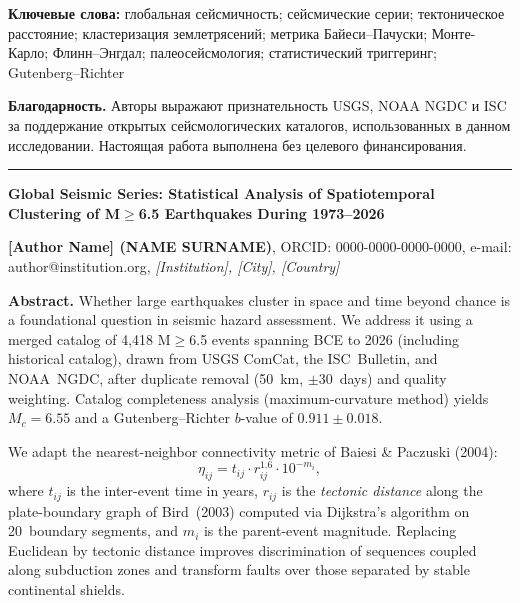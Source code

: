 \documentclass[12pt,a4paper]{article}
\begin{document}
\vspace{0.4cm}

\noindent\textbf{Ключевые слова:}
глобальная сейсмичность;
сейсмические серии;
тектоническое расстояние;
кластеризация землетрясений;
метрика Байеси--Пачуски;
Монте-Карло;
Флинн--Энгдал;
палеосейсмология;
статистический триггеринг;
Gutenberg--Richter

\vspace{0.4cm}

\noindent\textbf{Благодарность.}
Авторы выражают признательность USGS, NOAA NGDC и ISC за поддержание открытых
сейсмологических каталогов, использованных в данном исследовании.
Настоящая работа выполнена без целевого финансирования.

\vspace{0.8cm}
\hrule
\vspace{0.5cm}


\begin{center}
{\large\bfseries
Global Seismic Series: Statistical Analysis of Spatiotemporal\\
Clustering of M$\geq$6.5 Earthquakes During 1973--2026
}
\end{center}

\vspace{0.4cm}

\noindent\textbf{[Author Name] (NAME SURNAME)},
ORCID: 0000-0000-0000-0000,
e-mail: author@institution.org,
\textit{[Institution], [City], [Country]}

\vspace{0.6cm}

\noindent\textbf{Abstract.}
Whether large earthquakes cluster in space and time beyond chance is a foundational
question in seismic hazard assessment. We address it using a merged catalog of
4{,}418 M$\geq$6.5 events spanning BCE to 2026 (including historical catalog),
drawn from USGS ComCat, the ISC~Bulletin, and NOAA~NGDC,
after duplicate removal (50~km, $\pm$30~days) and quality weighting.
Catalog completeness analysis (maximum-curvature method) yields
$M_c=6.55$ and a Gutenberg--Richter $b$-value of $0.911\pm0.018$.

We adapt the nearest-neighbor connectivity metric of Baiesi \& Paczuski (2004):
\[
  \eta_{ij} = t_{ij} \cdot r_{ij}^{1.6} \cdot 10^{-m_i},
\]
where $t_{ij}$ is the inter-event time in years, $r_{ij}$ is the \textit{tectonic
distance} along the plate-boundary graph of Bird~(2003) computed via Dijkstra's
algorithm on 20~boundary segments, and $m_i$ is the parent-event magnitude.
Replacing Euclidean by tectonic distance improves discrimination of sequences
coupled along subduction zones and transform faults over those separated by
stable continental shields.
\end{document}
